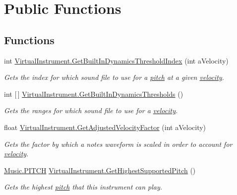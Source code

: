 \hypertarget{group___v_i_base_pub_func}{}\section{Public Functions}
\label{group___v_i_base_pub_func}
\subsection*{Functions}
\begin{DoxyCompactItemize}
\item 
int \hyperlink{group___v_i_base_pub_func_gacddf07c08c3a8154a6934be22f539788}{Virtual\+Instrument.\+Get\+Built\+In\+Dynamics\+Threshold\+Index} (int a\+Velocity)
\begin{DoxyCompactList}\small\item\em Gets the index for which sound file to use for a \hyperlink{group___music_enums_ga508f69b199ea518f935486c990edac1d}{pitch} at a given \hyperlink{group___audio_DefVel}{velocity}. \end{DoxyCompactList}\item 
int \mbox{[}$\,$\mbox{]} \hyperlink{group___v_i_base_pub_func_gac8fc20c49c1b97b6787ed1b3e0073a7f}{Virtual\+Instrument.\+Get\+Built\+In\+Dynamics\+Thresholds} ()
\begin{DoxyCompactList}\small\item\em Gets the ranges for which sound file to use for a \hyperlink{group___audio_DefVel}{velocity}. \end{DoxyCompactList}\item 
float \hyperlink{group___v_i_base_pub_func_gae638c68bd0e79d0b99495be69e50f49d}{Virtual\+Instrument.\+Get\+Adjusted\+Velocity\+Factor} (int a\+Velocity)
\begin{DoxyCompactList}\small\item\em Gets the factor by which a note\textquotesingle{}s waveform is scaled in order to account for \hyperlink{group___audio_DefVel}{velocity}. \end{DoxyCompactList}\item 
\hyperlink{group___music_enums_ga508f69b199ea518f935486c990edac1d}{Music.\+P\+I\+T\+CH} \hyperlink{group___v_i_base_pub_func_ga859f3e73b1d28051cecf0ecd1c8b10ee}{Virtual\+Instrument.\+Get\+Highest\+Supported\+Pitch} ()
\begin{DoxyCompactList}\small\item\em Gets the highest \hyperlink{group___music_enums_ga508f69b199ea518f935486c990edac1d}{pitch} that this instrument can play. \end{DoxyCompactList}\item 

\end{DoxyCompactItemize}

